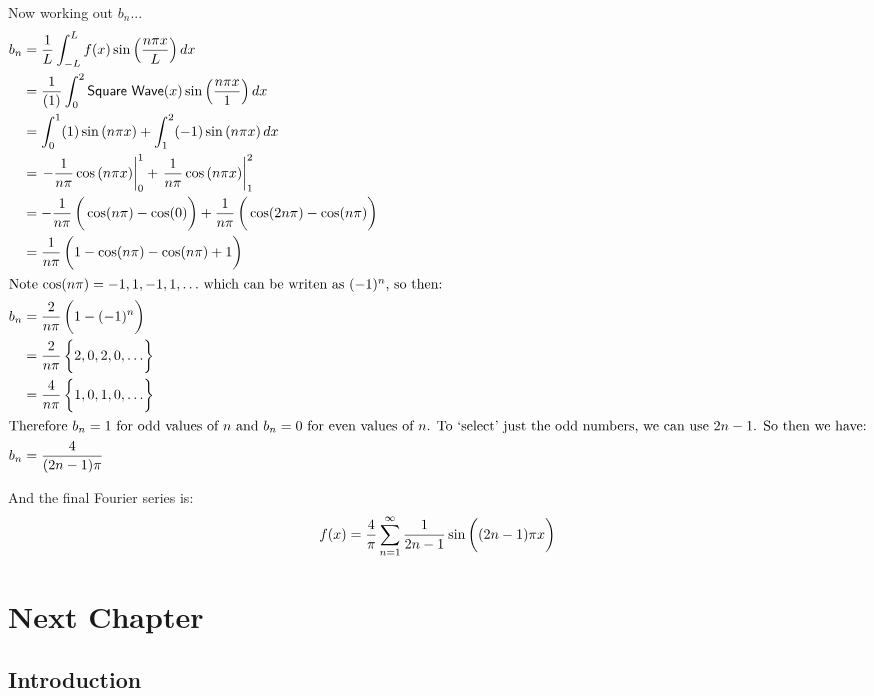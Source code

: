 \documentclass[10pt,letterpaper,twoside,final]{memoir}
\begin{document}
Now working out $b_n$...
\begin{align*}
b_n &= \frac{1}{L} \int_{-L}^L f(x) \sin \left( \frac{n\pi x}{L} \right) dx \\
    &= \frac{1}{(1)} \int_0^2 \mathsf{Square\ Wave}(x) \sin \left( \frac{n\pi x}{1} \right) dx \\
    &= \int_0^1 (1) \sin \left( n\pi x \right) + \int_1^2 (-1) \sin \left( n\pi x \right) dx \\
    &= \left. -\frac{1}{n \pi} \cos \left( n\pi x \right)\right|^1_0 + \left. \frac{1}{n \pi} \cos \left( n\pi x \right)\right|^2_1 \\
    &= -\frac{1}{n \pi} \left( \vphantom{\frac{1}{2}} \cos ( n\pi ) - \cos ( 0 ) \right) + \frac{1}{n \pi} \left( \vphantom{\frac{1}{2}} \cos(2n\pi) - \cos(n\pi) \right) \\ 
    &= \frac{1}{n \pi} \left( \vphantom{\frac{1}{2}} 1 - \cos(n\pi) - \cos(n\pi) + 1\right) \\
\intertext{Note $\cos(n\pi) = -1, 1, -1, 1, \ldots$\ which can be writen as $(-1)^n$, so then: }
b_n &= \frac{2}{n \pi} \left( \vphantom{\frac{1}{2}} 1 - (-1)^n \right) \\
    &= \frac{2}{n \pi} \left\{ \vphantom{\frac{1}{2}} 2, 0, 2, 0, \ldots \right\} \\
    &= \frac{4}{n \pi} \left\{ \vphantom{\frac{1}{2}} 1, 0, 1, 0, \ldots \right\} \\
\intertext{Therefore $b_n = 1$ for odd values of $n$ and $b_n = 0$ for even values of $n$.  To `select' just the odd numbers, we can use $2n - 1$.  So then we have:} 
b_n &= \frac{4}{(2n - 1)\pi} 
\end{align*}

And the final Fourier series is:
\[
f(x) = \frac{4}{\pi} \sum^\infty_{n = 1} \frac{1}{2n - 1} \sin \left( (2n - 1) \pi \vphantom{\frac{1}{2}} x \right)
\]

\lipsum[16-17]


\chapter{Next Chapter}

\section{Introduction}

\lipsum[17-18]
\end{document}

